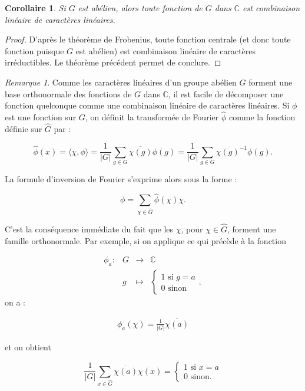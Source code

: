 \documentclass[french]{book}
\newtheorem{protocorollary}{Corollaire}
\newenvironment{corollary}
    {\colorlet{shadecolor}{violet!10}\begin{shaded}\begin{protocorollary}}
    {\end{protocorollary}\end{shaded}}
\theoremstyle{definition}
\theoremstyle{remark}
\newtheorem*{remark}{Remarque}
\begin{document}
\begin{corollary}
  Si \(G\) est abélien, alors toute fonction de \(G\) dans \(\mathbb{C}\) est combinaison linéaire de caractères linéaires.
\end{corollary}

\begin{proof}
  D'après le théorème de Frobenius, toute fonction centrale (et donc toute fonction puisque \(G\) est abélien) est combinaison linéaire de caractères irréductibles. Le théorème précédent permet de conclure.
\end{proof}

\begin{remark}
  Comme les caractères linéaires d'un groupe abélien \(G\) forment une base orthonormale des fonctions de \(G\) dans \(\mathbb{C}\), il est facile de décomposer une fonction quelconque comme une combinaison linéaire de caractères linéaires. Si \(\phi\) est une fonction sur \(G\), on définit la transformée de Fourier \(\hat{\phi}\) comme la fonction définie sur \(\hat{G}\) par :

  \[\hat{\phi}(x) = \langle \chi, \phi \rangle = \frac{1}{\left\lvert G \right\rvert} \sum_{g \in G} \overline{\chi(g)} \phi(g) =\frac{1}{\left\lvert G \right\rvert} \sum_{g \in G} \chi(g)^{-1} \phi(g).\]

  La formule d'inversion de Fourier s'exprime alors sous la forme :

  \[\phi = \sum_{\chi \in \hat{G}} \hat{\phi}(\chi) \chi.\]

  C'est la conséquence immédiate du fait que les \(\chi\), pour \(\chi \in \hat{G}\), forment une famille orthonormale. Par exemple, si on applique ce qui précède à la fonction

  \[\begin{matrix}
  \phi_a : & G & \longrightarrow & \mathbb{C} \\
  \ & g & \longmapsto & \begin{cases}
    1 \text{ si } g=a \\
    0 \text{ sinon}
  \end{cases},
  \end{matrix}\] on a :

  \begin{gather*}
    \phi_a(\chi) = \frac{1}{\left\lvert G \right\rvert} \overline{\chi(a)}
  \end{gather*}

  et on obtient

  \[\frac{1}{\left\lvert G \right\rvert} \sum_{x \in \hat{G}} \overline{\chi(a)} \chi(x) = \begin{cases}
    1 \text{ si } x=a \\
    0 \text{ sinon. }
  \end{cases}  \]
\end{remark}
\end{document}

